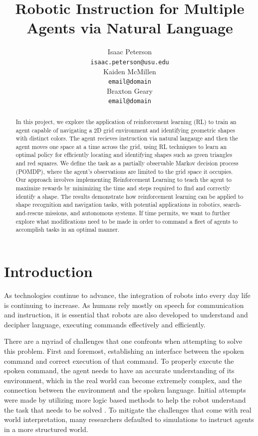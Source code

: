 \documentclass[11pt]{article}
\title{Robotic Instruction for Multiple Agents via Natural Language}
\author{Isaac Peterson \\
  \texttt{isaac.peterson@usu.edu} \\\And
  Kaiden McMillen \\
  \texttt{email@domain} \\\And 
  Braxton Geary \\
  \texttt{email@domain} 
  }
\begin{document}
\maketitle
\begin{abstract}
  In this project, we explore the application of reinforcement learning (RL) to train an agent capable of navigating a 2D grid environment and identifying geometric shapes with distinct colors. The agent recieves instruction via natural langauge and then the agent moves one space at a time across the grid, using RL techniques to learn an optimal policy for efficiently locating and identifying shapes such as green triangles and red squares. We define the task as a partially observable Markov decision process (POMDP), where the agent's observations are limited to the grid space it occupies. Our approach involves implementing Reinforcement Learning to teach the agent to maximize rewards by minimizing the time and steps required to find and correctly identify a shape. The results demonstrate how reinforcement learning can be applied to shape recognition and navigation tasks, with potential applications in robotics, search-and-rescue missions, and autonomous systems. If time permits, we want to further explore what modifications need to be made in order to command a fleet of agents to accomplish tasks in an optimal manner.

\end{abstract}

\section{Introduction}
As technologies continue to advance, the integration of robots into every day life is continuing to increase. As humans rely mostly on speech for communication and instruction, it is essential that robots are also developed to understand and decipher language, executing commands effectively and efficiently. 

There are a myriad of challenges that one confronts when attempting to solve this problem. First and foremost, establishing an interface between the spoken command and correct execution of that command. To properly execute the spoken command, the agent needs to have an accurate understanding of its environment, which in the real world can become extremely complex, and the connection between the environment and the spoken language. Initial attempts were made by utilizing more logic based methods to help the robot understand the task that needs to be solved \cite{Liu2016}. To mitigate the challenges that come with real world interpretation, many researchers defaulted to simulations to instruct agents in a more structured world.
\end{document}
